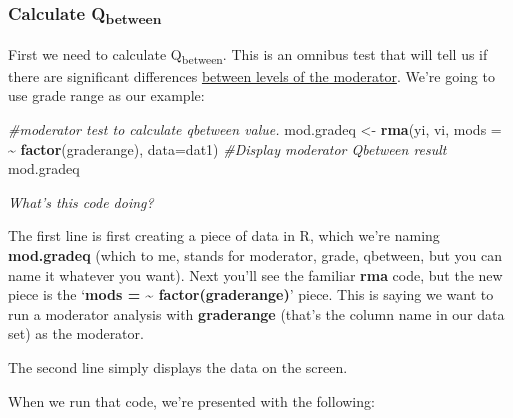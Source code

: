 \documentclass[
]{book}
\newenvironment{Shaded}{\begin{snugshade}}{\end{snugshade}}
\newcommand{\AttributeTok}[1]{\textcolor[rgb]{0.13,0.29,0.53}{#1}}
\newcommand{\CommentTok}[1]{\textcolor[rgb]{0.56,0.35,0.01}{\textit{#1}}}
\newcommand{\FunctionTok}[1]{\textcolor[rgb]{0.13,0.29,0.53}{\textbf{#1}}}
\newcommand{\NormalTok}[1]{#1}
\newcommand{\OtherTok}[1]{\textcolor[rgb]{0.56,0.35,0.01}{#1}}
\newcommand{\SpecialCharTok}[1]{\textcolor[rgb]{0.81,0.36,0.00}{\textbf{#1}}}
\begin{document}
\hypertarget{calculate-qbetween}{%
\subsubsection{\texorpdfstring{Calculate Q\textsubscript{between}}{Calculate Qbetween}}\label{calculate-qbetween}}

First we need to calculate Q\textsubscript{between}. This is an omnibus test that will tell us if there are significant differences \ul{between levels of the moderator}. We're going to use grade range as our example:

\begin{Shaded}
\begin{Highlighting}[]
\CommentTok{\#moderator test to calculate qbetween value. }
\NormalTok{mod.gradeq }\OtherTok{\textless{}{-}} \FunctionTok{rma}\NormalTok{(yi, vi, }\AttributeTok{mods =} \SpecialCharTok{\textasciitilde{}} \FunctionTok{factor}\NormalTok{(graderange), }\AttributeTok{data=}\NormalTok{dat1)}
\CommentTok{\#Display moderator Qbetween result}
\NormalTok{mod.gradeq}
\end{Highlighting}
\end{Shaded}

\emph{What's this code doing?}

The first line is first creating a piece of data in R, which we're naming \textbf{mod.gradeq} (which to me, stands for moderator, grade, qbetween, but you can name it whatever you want). Next you'll see the familiar \textbf{rma} code, but the new piece is the `\textbf{mods = \textasciitilde{} factor(graderange)}' piece. This is saying we want to run a moderator analysis with \textbf{graderange} (that's the column name in our data set) as the moderator.

The second line simply displays the data on the screen.

When we run that code, we're presented with the following:
\end{document}
